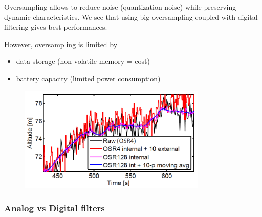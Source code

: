 \begin{minipage}{0.5 \linewidth}
Oversampling allows to reduce noise (quantization noise) while preserving
dynamic characteristics. We see that using big oversampling coupled with digital filtering gives best performances.

However, oversampling is limited by
\begin{itemize}
    \item data storage (non-volatile memory = cost)
    \item battery capacity (limited power consumption)
\end{itemize}


\end{minipage}\hfill
\begin{minipage}{0.5 \linewidth}
\begin{figure}[H]
    \centering
    \includegraphics[width = 0.8\textwidth]{L6/img/digital-oversampling.PNG}
\end{figure}

\end{minipage}

\subsubsection{Analog vs Digital filters}

